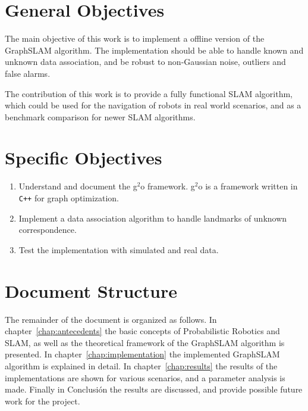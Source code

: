 \section{General Objectives}

The main objective of this work is to implement a offline version of the GraphSLAM algorithm. The implementation should be able to handle known and unknown data association, and be robust to non-Gaussian noise, outliers and false alarms.

The contribution of this work is to provide a fully functional SLAM algorithm, which could be used for the navigation of robots in real world scenarios, and as a benchmark comparison for newer SLAM algorithms.

\section{Specific Objectives}

\begin{enumerate}
    \item Understand and document the g$^2$o framework. g$^2$o is a framework written in \texttt{C++} for graph optimization.
    \item Implement a data association algorithm to handle landmarks of unknown correspondence.
    \item Test the implementation with simulated and real data. 
\end{enumerate}

\section{Document Structure}

The remainder of the document is organized as follows. In chapter~\ref{chap:antecedents} the basic concepts of Probabilistic Robotics and SLAM, as well as the theoretical framework of the GraphSLAM algorithm is presented. In chapter~\ref{chap:implementation} the implemented GraphSLAM algorithm is explained in detail. In chapter~\ref{chap:results} the results of the implementations are shown for various scenarios, and a parameter analysis is made. Finally in Conclusi\'on the results are discussed, and provide possible future work for the project. 
